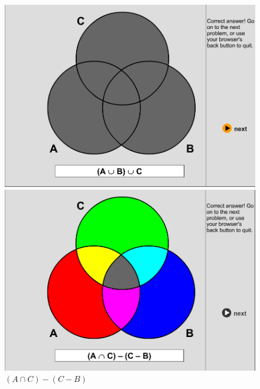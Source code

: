 \documentclass[12pt,en,a4paper]{article}
\begin{document}
	\begin{figure}[ht]
		\begin{minipage}{0.5\textwidth}
			\includegraphics[width=1.0\textwidth]{SOL_set_1_3.png}
			\caption*{$(A \cup B) \cup C$}
			\label{fig:prob_1_3}
		\end{minipage}
		\begin{minipage}{0.5\textwidth}
			\includegraphics[width=1.0\textwidth]{SOL_set_1_4.png}
			\caption*{$(A \cap C)-(C-B)$}
			\label{fig:prob_1_4}
		\end{minipage}
	\end{figure}
\end{document}
